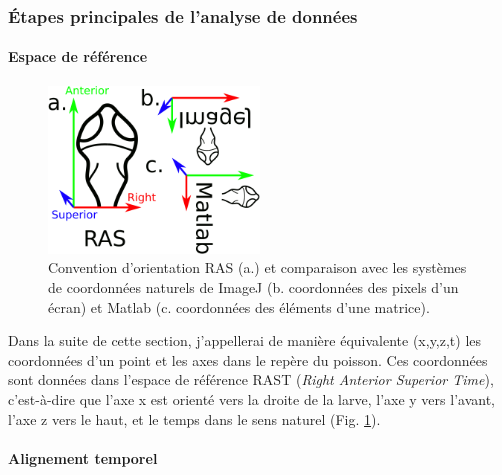 \subsubsection{Étapes principales de l'analyse de données}

\paragraph{Espace de référence}

\begin{figure}[b]
    \centering
    \includegraphics[width=0.5\textwidth]{./files/RAST.svg.png}
    \caption{Convention d'orientation RAS (a.) et comparaison avec les systèmes de coordonnées naturels de ImageJ (b. coordonnées des pixels d'un écran) et Matlab (c. coordonnées des éléments d'une matrice).
    \label{FIGorientationconvention}}
    \end{figure}

Dans la suite de cette section, j'appellerai de manière équivalente (x,y,z,t) les coordonnées d'un point et les axes dans le repère du poisson. Ces coordonnées sont données dans l'espace de référence RAST (\emph{Right Anterior Superior Time}), c'est-à-dire que l'axe x est orienté vers la droite de la larve, l'axe y vers l'avant, l'axe z vers le haut, et le temps dans le sens naturel (Fig. \ref{FIGorientationconvention}).


\paragraph{Alignement temporel}


